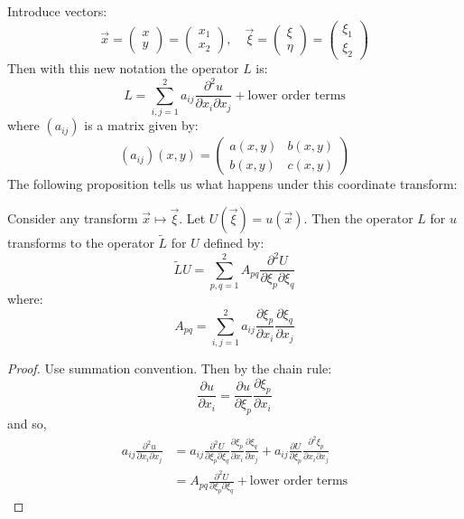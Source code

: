\documentclass[../Main.tex]{subfiles}
\begin{document}
Introduce vectors:
\begin{equation*}
    \vec{x} = \begin{pmatrix}x \\ y\end{pmatrix} = \begin{pmatrix}x_1 \\ x_2\end{pmatrix},\quad \vec{\xi} = \begin{pmatrix}\xi \\ \eta\end{pmatrix} = \begin{pmatrix}\xi_1 \\ \xi_2\end{pmatrix}
\end{equation*}
Then with this new notation the operator $L$ is:
\begin{equation*}
    L = \sum_{i, j = 1}^2 a_{ij} \frac{\partial^{2}u}{\partial x_i\partial x_j} + \text{lower order terms}
\end{equation*}
where $(a_{ij})$ is a matrix given by:
\begin{equation*}
    (a_{ij})(x, y) = \begin{pmatrix}
        a(x, y) & b(x, y) \\
        b(x, y) & c(x, y)
    \end{pmatrix}
\end{equation*}
The following proposition tells us what happens under this coordinate transform:
\begin{proposition}
    Consider any transform $\vec{x} \mapsto \vec{\xi}$.
    Let $U(\vec{\xi}) = u(\vec{x})$.
    Then the operator $L$ for $u$ transforms to the operator $\tilde{L}$ for $U$ defined by:
    \begin{equation*}
        \tilde{L}U = \sum_{p, q = 1}^{2} A_{pq} \frac{\partial^{2}U}{\partial \xi_p\partial \xi_q}
    \end{equation*}
    where:
    \begin{equation*}
        A_{pq} = \sum_{i, j = 1}^{2} a_{ij} \frac{\partial \xi_p}{\partial x_i} \frac{\partial \xi_q}{\partial x_j}
    \end{equation*}
    \label{propTransformPDE}
\end{proposition}
\begin{proof}
    Use summation convention. Then by the chain rule:
    \begin{equation*}
        \frac{\partial u}{\partial x_i} = \frac{\partial u}{\partial \xi_p} \frac{\partial \xi_p}{\partial x_i}
    \end{equation*}
    and so,
    \begin{align*}
        a_{ij} \frac{\partial^{2}u}{\partial x_i\partial x_j}&= a_{ij} \frac{\partial^{2}U}{\partial \xi_p\partial \xi_q} \frac{\partial \xi_p}{\partial x_i} \frac{\partial \xi_q}{\partial x_j} + a_{ij} \frac{\partial U}{\partial \xi_p} \frac{\partial^{2}\xi_p}{\partial x_i\partial x_j} \\
        &= A_{pq} \frac{\partial^{2}U}{\partial \xi_p\partial \xi_q} + \text{lower order terms}
    \end{align*}
\end{proof}
\end{document}
